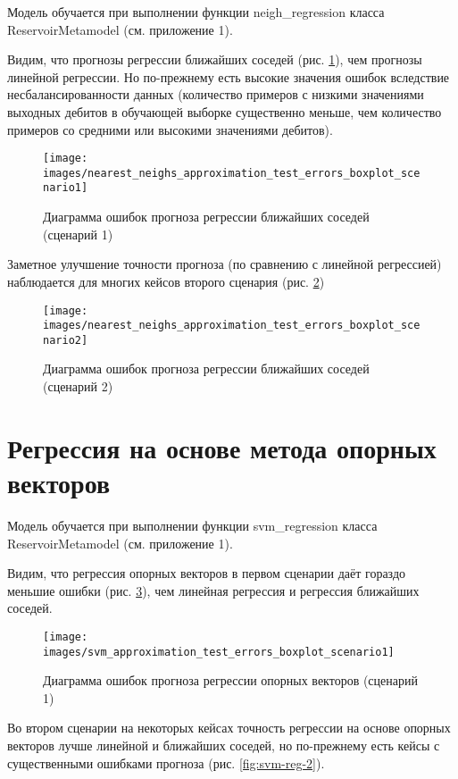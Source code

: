 Модель обучается при выполнении функции neigh\_regression класса ReservoirMetamodel (см. приложение 1).

Видим, что прогнозы регрессии ближайших соседей (рис. \ref{fig:neighs-reg-1}), чем прогнозы линейной регрессии. Но по-прежнему есть высокие значения ошибок вследствие несбалансированности данных (количество примеров с низкими значениями выходных дебитов в обучающей выборке существенно меньше, чем количество примеров со средними или высокими значениями дебитов).  

\begin{figure}[H] 
	\center
	\texttt{[image: images/nearest\_neighs\_approximation\_test\_errors\_boxplot\_scenario1]}
	\caption{Диаграмма ошибок прогноза регрессии ближайших соседей (сценарий 1)} 
	\label{fig:neighs-reg-1}
\end{figure}

Заметное улучшение точности прогноза (по сравнению с линейной регрессией) наблюдается для многих кейсов второго сценария (рис. \ref{fig:neighs-reg-2})

\begin{figure}[H] 
	\center
	\texttt{[image: images/nearest\_neighs\_approximation\_test\_errors\_boxplot\_scenario2]}
	\caption{Диаграмма ошибок прогноза регрессии ближайших соседей (сценарий 2)} 
	\label{fig:neighs-reg-2}
\end{figure}


\section{Регрессия на основе метода опорных векторов} \label{ch1:sec3}

Модель обучается при выполнении функции svm\_regression класса ReservoirMetamodel (см. приложение 1).

Видим, что регрессия опорных векторов в первом сценарии даёт гораздо меньшие ошибки (рис. \ref{fig:svm-reg-1}), чем линейная регрессия и регрессия ближайших соседей.

\begin{figure}[H] 
	\center
	\texttt{[image: images/svm\_approximation\_test\_errors\_boxplot\_scenario1]}
	\caption{Диаграмма ошибок прогноза регрессии опорных векторов (сценарий 1)} 
	\label{fig:svm-reg-1}
\end{figure}

Во втором сценарии на некоторых кейсах точность регрессии на основе опорных векторов лучше линейной и ближайших соседей, но по-прежнему есть кейсы с существенными ошибками прогноза (рис. \ref{fig:svm-reg-2}).

